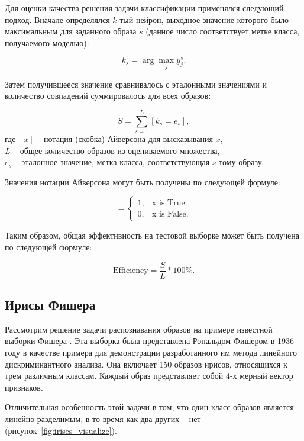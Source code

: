 Для оценки качества решения задачи классификации применялся следующий подход. Вначале определялся $k$-тый нейрон, выходное значение которого было максимальным для заданного образа $s$ (данное число соответствует метке класса, получаемого моделью):

\begin{equation}
  k_s = \arg \max_j y_j^s.
\end{equation}

Затем получившееся значение сравнивалось с эталонными значениями и количество совпадений суммировалось для всех образов:

\begin{equation}
  S = \sum_{s=1}^{L} [k_s = e_s],
\end{equation}
где $[x]$ -- нотация (скобка) Айверсона для высказывания $x$,\\
$L$ -- общее количество образов из оцениваемого множества,\\
$e_s$ -- эталонное значение, метка класса, соответствующая $s$-тому образу.

Значения нотации Айверсона могут быть получены по следующей формуле:

\begin{equation*}
    [x] = 
    \begin{cases}
        1, & \text{x is True} \\
        0, & \text{x is False}.
    \end{cases}
\end{equation*}

Таким образом, общая эффективность на тестовой выборке может быть получена по следующей формуле:

\begin{equation}
\text{Efficiency} = \frac{S}{L} * 100\%.
\end{equation}

\subsection{Ирисы Фишера}

Рассмотрим решение задачи распознавания образов на примере известной выборки Фишера \cite{Fisher}. Эта выборка была представлена Рональдом Фишером в 1936 году в качестве примера для демонстрации разработанного им метода линейного дискриминантного анализа. Она включает 150 образов ирисов, относящихся к трем различным классам. Каждый образ представляет собой 4-х мерный вектор признаков.

Отличительная особенность этой задачи в том, что один класс образов является линейно разделимым, в то время как два других -- нет (рисунок~\ref{fig:irises_visualize}).

